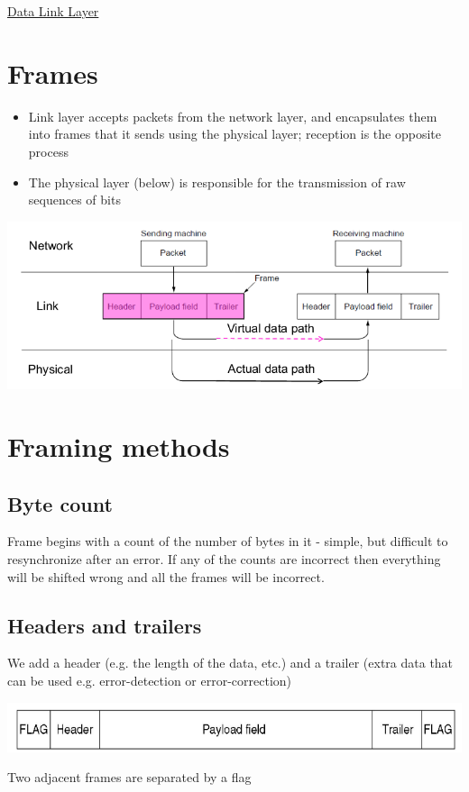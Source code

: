 \documentclass{article}[18pt]
\begin{document}
\begin{center}
\underline{\huge Data Link Layer}
\end{center}
\section{Frames}
\begin{itemize}
	\item Link layer accepts packets from the network layer, and encapsulates them into frames that it sends using the physical layer; reception is the opposite process
	\item The physical layer (below) is responsible for the transmission of raw sequences of bits
\end{itemize}
\begin{center}
	\includegraphics[scale=0.7]{frame}
\end{center}
\section{Framing methods}
\subsection{Byte count}
Frame begins with a count of the number of bytes in it - simple, but difficult to resynchronize after an error. If any of the counts are incorrect then everything will be shifted wrong and all the frames will be incorrect.
\subsection{Headers and trailers}
We add a header (e.g. the length of the data, etc.) and a trailer (extra data that can be used e.g. error-detection or error-correction)
\begin{center}
	\includegraphics[scale=0.7]{flag}
\end{center}
Two adjacent frames are separated by a flag
\end{document}
